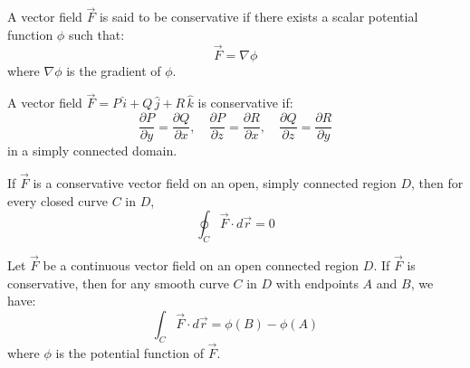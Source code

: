 \documentclass[11pt]{report}
\begin{document}
\begin{definition}
    A vector field $\vec{F}$ is said to be conservative if there exists a scalar potential function $\phi$ such that:
    \begin{equation}
        \vec{F} = \nabla \phi
    \end{equation}
    where $\nabla \phi$ is the gradient of $\phi$.
    
\end{definition}

\begin{theorem}
    A vector field $\vec{F} = P \, \hat{i} + Q \, \hat{j} + R \, \hat{k}$ is conservative if:
    \begin{equation}
        \frac{\partial P}{\partial y} = \frac{\partial Q}{\partial x}, \quad \frac{\partial P}{\partial z} = \frac{\partial R}{\partial x}, \quad \frac{\partial Q}{\partial z} = \frac{\partial R}{\partial y}
    \end{equation}
    in a simply connected domain.
\end{theorem}

\begin{theorem}
    If \(\vec F\) is a conservative vector field on an open, simply connected region \(D\), then for every closed curve \(C\) in \(D\),
    \[
        \oint_C \vec F \cdot d\vec r = 0
    \]
\end{theorem}

\begin{theorem}
    Let $\vec{F}$ be a continuous vector field on an open connected region $D$. If $\vec{F}$ is conservative, then for any smooth curve $C$ in $D$ with endpoints $A$ and $B$, we have:
    \begin{equation}
        \int_C \vec{F} \cdot d\vec{r} = \phi(B) - \phi(A)
    \end{equation}
    where $\phi$ is the potential function of $\vec{F}$.
\end{theorem}
\end{document}
